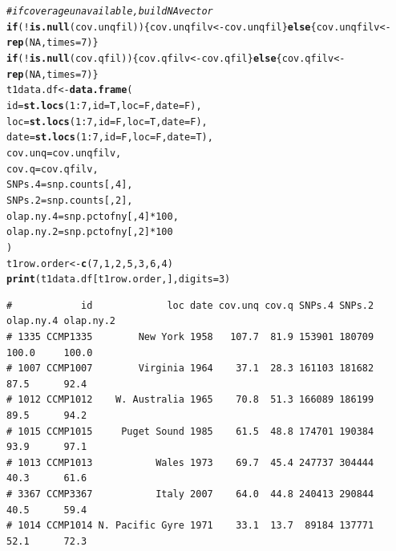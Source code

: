 \documentclass{article}\usepackage[]{graphicx}\usepackage[]{color}
\makeatletter
\newcommand{\hlnum}[1]{\textcolor[rgb]{0.686,0.059,0.569}{#1}}%
\newcommand{\hlcom}[1]{\textcolor[rgb]{0.678,0.584,0.686}{\textit{#1}}}%
\newcommand{\hlopt}[1]{\textcolor[rgb]{0,0,0}{#1}}%
\newcommand{\hlstd}[1]{\textcolor[rgb]{0.345,0.345,0.345}{#1}}%
\newcommand{\hlkwa}[1]{\textcolor[rgb]{0.161,0.373,0.58}{\textbf{#1}}}%
\newcommand{\hlkwb}[1]{\textcolor[rgb]{0.69,0.353,0.396}{#1}}%
\newcommand{\hlkwc}[1]{\textcolor[rgb]{0.333,0.667,0.333}{#1}}%
\newcommand{\hlkwd}[1]{\textcolor[rgb]{0.737,0.353,0.396}{\textbf{#1}}}%
\newenvironment{kframe}{%
 \def\at@end@of@kframe{}%
 \ifinner\ifhmode%
  \def\at@end@of@kframe{\end{minipage}}%
  \begin{minipage}{\columnwidth}%
 \fi\fi%
 \def\FrameCommand##1{\hskip\@totalleftmargin \hskip-\fboxsep
 \colorbox{shadecolor}{##1}\hskip-\fboxsep
     \hskip-\linewidth \hskip-\@totalleftmargin \hskip\columnwidth}%
 \MakeFramed {\advance\hsize-\width
   \@totalleftmargin\z@ \linewidth\hsize
   \@setminipage}}%
 {\par\unskip\endMakeFramed%
 \at@end@of@kframe}
\newenvironment{knitrout}{}{} %
\makeatother
\begin{document}
\begin{knitrout}\footnotesize
{}\color{fgcolor}\begin{kframe}
\begin{alltt}
\hlcom{# if coverage unavailable, build NA vector}
\hlkwa{if}\hlstd{(}\hlopt{!}\hlkwd{is.null}\hlstd{(cov.unqfil))\{cov.unqfilv} \hlkwb{<-} \hlstd{cov.unqfil\}} \hlkwa{else} \hlstd{\{cov.unqfilv} \hlkwb{<-} \hlkwd{rep}\hlstd{(}\hlnum{NA}\hlstd{,}\hlkwc{times}\hlstd{=}\hlnum{7}\hlstd{)\}}
\hlkwa{if}\hlstd{(}\hlopt{!}\hlkwd{is.null}\hlstd{(cov.qfil  ))\{cov.qfilv}   \hlkwb{<-} \hlstd{cov.qfil  \}} \hlkwa{else} \hlstd{\{cov.qfilv}   \hlkwb{<-} \hlkwd{rep}\hlstd{(}\hlnum{NA}\hlstd{,}\hlkwc{times}\hlstd{=}\hlnum{7}\hlstd{)\}}
\hlstd{t1data.df} \hlkwb{<-} \hlkwd{data.frame}\hlstd{(}
  \hlkwc{id}        \hlstd{=} \hlkwd{st.locs}\hlstd{(}\hlnum{1}\hlopt{:}\hlnum{7}\hlstd{,} \hlkwc{id}\hlstd{=T,} \hlkwc{loc}\hlstd{=F,} \hlkwc{date}\hlstd{=F),}
  \hlkwc{loc}       \hlstd{=} \hlkwd{st.locs}\hlstd{(}\hlnum{1}\hlopt{:}\hlnum{7}\hlstd{,} \hlkwc{id}\hlstd{=F,} \hlkwc{loc}\hlstd{=T,} \hlkwc{date}\hlstd{=F),}
  \hlkwc{date}      \hlstd{=} \hlkwd{st.locs}\hlstd{(}\hlnum{1}\hlopt{:}\hlnum{7}\hlstd{,} \hlkwc{id}\hlstd{=F,} \hlkwc{loc}\hlstd{=F,} \hlkwc{date}\hlstd{=T),}
  \hlkwc{cov.unq}   \hlstd{= cov.unqfilv,}
  \hlkwc{cov.q}     \hlstd{= cov.qfilv,}
  \hlkwc{SNPs.4}    \hlstd{= snp.counts[,}\hlnum{4}\hlstd{],}
  \hlkwc{SNPs.2}    \hlstd{= snp.counts[,}\hlnum{2}\hlstd{],}
  \hlkwc{olap.ny.4} \hlstd{= snp.pctofny[,}\hlnum{4}\hlstd{]}\hlopt{*}\hlnum{100}\hlstd{,}
  \hlkwc{olap.ny.2} \hlstd{= snp.pctofny[,}\hlnum{2}\hlstd{]}\hlopt{*}\hlnum{100}
\hlstd{)}
\hlstd{t1row.order} \hlkwb{<-} \hlkwd{c}\hlstd{(}\hlnum{7}\hlstd{,}\hlnum{1}\hlstd{,}\hlnum{2}\hlstd{,}\hlnum{5}\hlstd{,}\hlnum{3}\hlstd{,}\hlnum{6}\hlstd{,}\hlnum{4}\hlstd{)}
\hlkwd{print}\hlstd{(t1data.df[t1row.order,],}\hlkwc{digits}\hlstd{=}\hlnum{3}\hlstd{)}
\end{alltt}
\begin{verbatim}
#            id             loc date cov.unq cov.q SNPs.4 SNPs.2 olap.ny.4 olap.ny.2
# 1335 CCMP1335        New York 1958   107.7  81.9 153901 180709     100.0     100.0
# 1007 CCMP1007        Virginia 1964    37.1  28.3 161103 181682      87.5      92.4
# 1012 CCMP1012    W. Australia 1965    70.8  51.3 166089 186199      89.5      94.2
# 1015 CCMP1015     Puget Sound 1985    61.5  48.8 174701 190384      93.9      97.1
# 1013 CCMP1013           Wales 1973    69.7  45.4 247737 304444      40.3      61.6
# 3367 CCMP3367           Italy 2007    64.0  44.8 240413 290844      40.5      59.4
# 1014 CCMP1014 N. Pacific Gyre 1971    33.1  13.7  89184 137771      52.1      72.3
\end{verbatim}
\end{kframe}
\end{knitrout}
\end{document}
